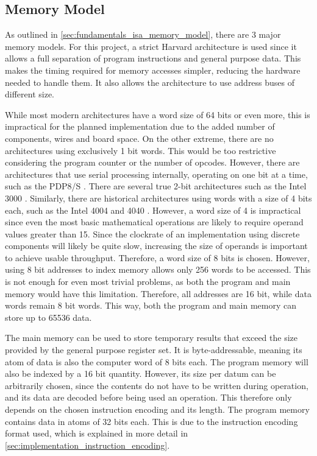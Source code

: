 \subsection{Memory Model} \label{sec:implementation_isa_memory_model}

As outlined in \autoref{sec:fundamentals_isa_memory_model}, there are 3 major memory models. For this project, a strict Harvard architecture is used since it allows a full separation of program instructions and general purpose data. This makes the timing required for memory accesses simpler, reducing the hardware needed to handle them. It also allows the architecture to use address buses of different size. 

While most modern architectures have a word size of 64 bits or even more, this is impractical for the planned implementation due to the added number of components, wires and board space. On the other extreme, there are no architectures using exclusively 1 bit words. This would be too restrictive considering the program counter or the number of opcodes. However, there are architectures that use serial processing internally, operating on one bit at a time, such as the PDP8/S \cite{computermuseum_pdp8s}. There are several true 2-bit architectures such as the Intel 3000 \cite{wikichip_intel3000}. Similarly, there are historical architectures using words with a size of 4 bits each, such as the Intel 4004 and 4040 \cite{intel4004history}. However, a word size of 4 is impractical since even the most basic mathematical operations are likely to require operand values greater than 15. Since the clockrate of an implementation using discrete components will likely be quite slow, increasing the size of operands is important to achieve usable throughput. Therefore, a word size of 8 bits is chosen. However, using 8 bit addresses to index memory allows only 256 words to be accessed. This is not enough for even most trivial problems, as both the program and main memory would have this limitation. Therefore, all addresses are 16 bit, while data words remain 8 bit words. This way, both the program and main memory can store up to 65536 data.

The main memory can be used to store temporary results that exceed the size provided by the general purpose register set. It is byte-addressable, meaning its atom of data is also the computer word of 8 bits each. The program memory will also be indexed by a 16 bit quantity. However, its size per datum can be arbitrarily chosen, since the contents do not have to be written during operation, and its data are decoded before being used an operation. This therefore only depends on the chosen instruction encoding and its length. The program memory contains data in atoms of 32 bits each. This is due to the instruction encoding format used, which is explained in more detail in \autoref{sec:implementation_instruction_encoding}.

